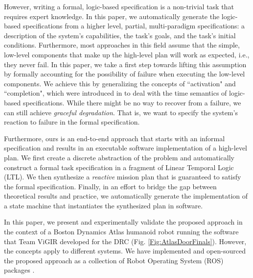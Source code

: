 However, writing a formal, logic-based specification is a non-trivial task that requires expert knowledge.
In this paper, we automatically generate the logic-based specifications from a higher level, partial, multi-paradigm specifications: a description of the system's capabilities, the task's goals, and the task's initial conditions.
Furthermore, most approaches in this field assume that the simple, low-level components that make up the high-level plan will work as expected, i.e., they never fail.
In this paper, we take a first step towards lifting this assumption by formally accounting for the possibility of failure when executing the low-level components.
We achieve this by generalizing the concepts of ``activation" and ``completion", which were introduced in \cite{Vasu2013ICRA} to deal with the time semantics of logic-based specifications.
While there might be no way to recover from a failure, we can still achieve \emph{graceful degradation}.
That is, we want to specify the system's reaction to failure in the formal specification.

Furthermore, ours is an end-to-end approach that starts with an informal specification and results in an executable software implementation of a high-level plan.
We first create a discrete abstraction of the problem and automatically construct a formal task specification in a fragment of Linear Temporal Logic (\textsc{LTL}).
We then synthesize a \emph{reactive} mission plan that is guaranteed to satisfy the formal specification.
Finally, in an effort to bridge the gap between theoretical results and practice, we automatically generate the implementation of a state machine that instantiates the synthesized plan in software.

In this paper, we present and experimentally validate the proposed approach in the context of a Boston Dynamics Atlas humanoid robot running the software that Team ViGIR developed for the DRC (Fig. \ref{Fig:AtlasDoorFinals}).
However, the concepts apply to different systems.
We have implemented and open-sourced the proposed approach as a collection of Robot Operating System (ROS) packages \cite{ROS2009ICRA, ROS}.

